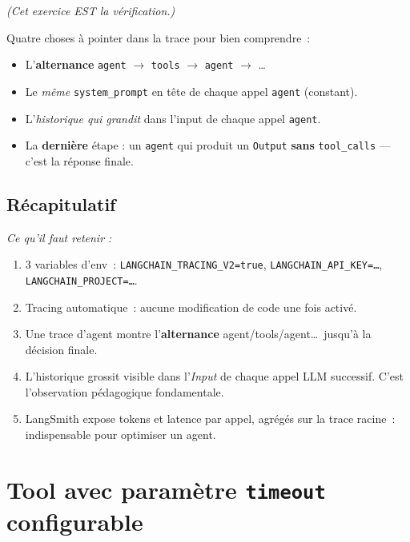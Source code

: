 \documentclass[11pt,a4paper]{article}
\begin{document}
\emph{(Cet exercice EST la vérification.)}

Quatre choses à pointer dans la trace pour bien comprendre~:

\begin{itemize}[leftmargin=*]
  \item L'\textbf{alternance} \texttt{agent} $\to$ \texttt{tools} $\to$
        \texttt{agent} $\to$ \dots
  \item Le \emph{même} \texttt{system\_prompt} en tête de chaque appel
        \texttt{agent} (constant).
  \item L'\emph{historique qui grandit} dans l'input de chaque appel
        \texttt{agent}.
  \item La \textbf{dernière} étape : un \texttt{agent} qui produit un
        \texttt{Output} \textbf{sans} \texttt{tool\_calls} — c'est la
        réponse finale.
\end{itemize}

\subsection*{Récapitulatif}
{\itshape\sloppy
\textit{Ce qu'il faut retenir :}
\begin{enumerate}[leftmargin=*]
  \item 3 variables d'env~: \texttt{LANGCHAIN\_TRACING\_V2=true},
        \texttt{LANGCHAIN\_API\_KEY=\dots},
        \texttt{LANGCHAIN\_PROJECT=\dots}.
  \item Tracing automatique~: aucune modification de code une fois
        activé.
  \item Une trace d'agent montre l'\textbf{alternance}
        agent/tools/agent\dots\ jusqu'à la décision finale.
  \item L'historique grossit visible dans l'\emph{Input} de chaque
        appel LLM successif. C'est l'observation pédagogique
        fondamentale.
  \item LangSmith expose tokens et latence par appel, agrégés sur la
        trace racine~: indispensable pour optimiser un agent.
\end{enumerate}
\par}

\section{Tool avec paramètre \texttt{timeout} configurable}
\end{document}

